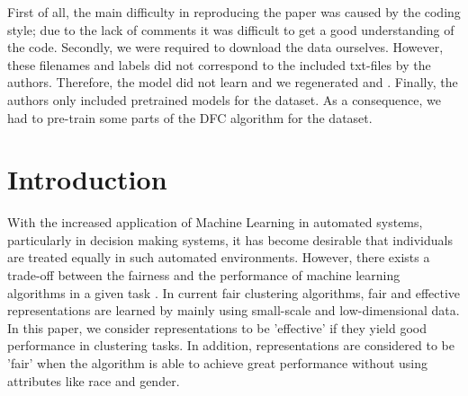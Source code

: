 First of all, the main difficulty in reproducing the paper was caused by the coding style; due to the lack of comments it was difficult to get a good understanding of the code. Secondly, we were required to download the data ourselves. However, these filenames and labels did not correspond to the included txt-files by the authors. Therefore, the model did not learn and we regenerated  and . Finally, the authors only included pretrained models for the \USPSMNIST dataset. As a consequence, we had to pre-train some parts of the DFC algorithm for the \revMNIST dataset.




\newpage

\section{Introduction}

With the increased application of Machine Learning in automated systems, particularly in decision making systems, it has become desirable that individuals are treated equally in such automated environments. However, there exists a trade-off between the fairness and the performance of machine learning algorithms in a given task \citep{Li_2020_CVPR}. In current fair clustering algorithms, fair and effective representations are learned by mainly using small-scale and low-dimensional data. In this paper, we consider representations to be 'effective' if they yield good performance in clustering tasks. In addition, representations are considered to be 'fair' when the algorithm is able to achieve great performance without using attributes like race and gender.

